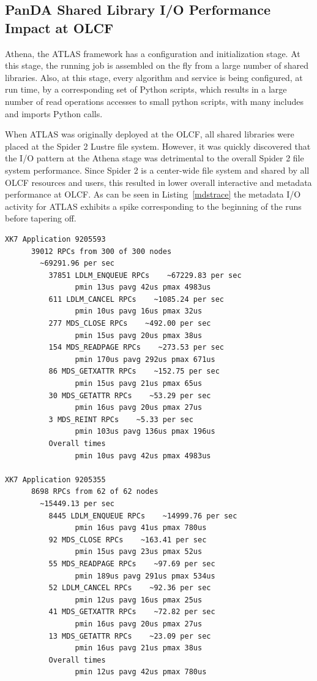 \subsection{PanDA Shared Library I/O Performance Impact at OLCF}

Athena, the ATLAS framework has a configuration and initialization stage. At
this stage, the running job is assembled  on the fly from a large number of
shared libraries.  Also, at this stage, every algorithm and service is being
configured, at run time, by a corresponding set of Python scripts, which
results in a large number of read operations accesses to small python scripts, with
many includes and imports Python calls.

When ATLAS was originally deployed at the OLCF, all shared libraries were
placed at the Spider 2 Lustre file system. However, it was quickly discovered
that the I/O pattern at the Athena stage was detrimental to the overall Spider
2 file system performance. Since Spider 2 is a center-wide file system and
shared by all OLCF resources and users, this resulted in lower overall
interactive and metadata performance at OLCF\@. As can be seen in
Listing~\ref{mdstrace} the metadata I/O activity for ATLAS exhibits a spike
corresponding to the beginning of the runs before tapering off.

\begin{minipage}{\linewidth}
\begin{lstlisting}[language=bash,frame=single,basicstyle=\ttfamily\tiny,caption=ATLAS metadata trace,label=mdstrace]
XK7 Application 9205593
      39012 RPCs from 300 of 300 nodes
        ~69291.96 per sec
          37851 LDLM_ENQUEUE RPCs    ~67229.83 per sec
                pmin 13us pavg 42us pmax 4983us
          611 LDLM_CANCEL RPCs    ~1085.24 per sec
                pmin 10us pavg 16us pmax 32us
          277 MDS_CLOSE RPCs    ~492.00 per sec
                pmin 15us pavg 20us pmax 38us
          154 MDS_READPAGE RPCs    ~273.53 per sec
                pmin 170us pavg 292us pmax 671us
          86 MDS_GETXATTR RPCs    ~152.75 per sec
                pmin 15us pavg 21us pmax 65us
          30 MDS_GETATTR RPCs    ~53.29 per sec
                pmin 16us pavg 20us pmax 27us
          3 MDS_REINT RPCs    ~5.33 per sec
                pmin 103us pavg 136us pmax 196us
          Overall times
                pmin 10us pavg 42us pmax 4983us

XK7 Application 9205355
      8698 RPCs from 62 of 62 nodes
        ~15449.13 per sec
          8445 LDLM_ENQUEUE RPCs    ~14999.76 per sec
                pmin 16us pavg 41us pmax 780us
          92 MDS_CLOSE RPCs    ~163.41 per sec
                pmin 15us pavg 23us pmax 52us
          55 MDS_READPAGE RPCs    ~97.69 per sec
                pmin 189us pavg 291us pmax 534us
          52 LDLM_CANCEL RPCs    ~92.36 per sec
                pmin 12us pavg 16us pmax 25us
          41 MDS_GETXATTR RPCs    ~72.82 per sec
                pmin 16us pavg 20us pmax 27us
          13 MDS_GETATTR RPCs    ~23.09 per sec
                pmin 16us pavg 21us pmax 38us
          Overall times
                pmin 12us pavg 42us pmax 780us

\end{lstlisting}
\end{minipage}

